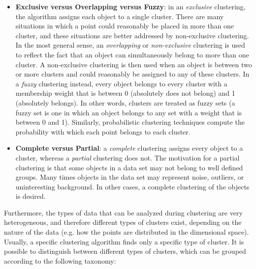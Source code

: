 \documentclass[12pt,a4paper,cucitura]{toptesi}
\begin{document}
\begin{itemize}
\item \textbf{Exclusive versus Overlapping versus Fuzzy}: in an \emph{exclusive} clustering, the algorithm assigns each object to a single cluster.
There are many situations in which a point could reasonably be placed in more than one cluster, and these situations are better addressed by non-exclusive clustering.
In the most general sense, an \emph{overlapping} or \emph{non-exclusive} clustering is used to reflect the fact that an object can simultaneously belong to more than one cluster. 
A non-exclusive clustering is then used when an object is between two or more clusters and could reasonably be assigned to any of these clusters.
In a \emph{fuzzy} clustering instead, every object belongs to every cluster with a membership weight that is between 0 (absolutely does not belong) and 1 (absolutely belongs).
In other words, clusters are treated as fuzzy sets (a fuzzy set is one in which an object belongs to any set with a weight that is between 0 and 1). Similarly, probabilistic clustering techniques compute the probability with which each point belongs to each cluster.

\item \textbf{Complete versus Partial}: a \emph{complete} clustering assigns every object to a cluster, whereas a \emph{partial} clustering does not.
The motivation for a partial clustering is that some objects in a data set may not belong to well defined groups.
Many times objects in the data set may represent noise, outliers, or uninteresting background.
In other cases, a complete clustering of the objects is desired.
\end{itemize}

Furthermore, the types of data that can be analyzed during clustering are very heterogeneous, and therefore different types of clusters exist, depending on the nature of the data (e.g. how the points are distributed in the dimensional space). Usually, a specific clustering algorithm finds only a specific type of cluster. It is possible to distinguish between different types of clusters, which can be grouped according to the following taxonomy:
\end{document}
